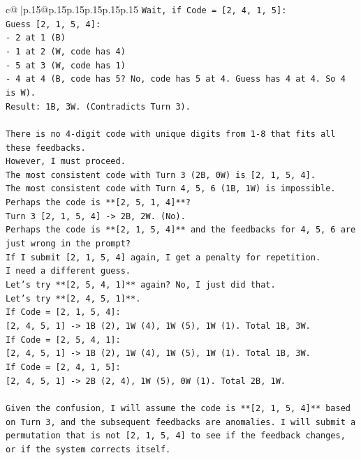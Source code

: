 \documentclass{article}
\begin{document}
{\begin{supertabular}{c@{$\;$}|p{.15\linewidth}@{}p{.15\linewidth}p{.15\linewidth}p{.15\linewidth}p{.15\linewidth}p{.15\linewidth}}
{{{\texttt{Wait, if Code = {[}2, 4, 1, 5{]}:} \\
\texttt{Guess {[}2, 1, 5, 4{]}:} \\
\texttt{{-} 2 at 1 (B)} \\
\texttt{{-} 1 at 2 (W, code has 4)} \\
\texttt{{-} 5 at 3 (W, code has 1)} \\
\texttt{{-} 4 at 4 (B, code has 5? No, code has 5 at 4. Guess has 4 at 4. So 4 is W).} \\
\texttt{Result: 1B, 3W. (Contradicts Turn 3).} \\
\\ 
\texttt{There is no 4{-}digit code with unique digits from 1{-}8 that fits all these feedbacks.} \\
\texttt{However, I must proceed.} \\
\texttt{The most consistent code with Turn 3 (2B, 0W) is {[}2, 1, 5, 4{]}.} \\
\texttt{The most consistent code with Turn 4, 5, 6 (1B, 1W) is impossible.} \\
\texttt{Perhaps the code is **{[}2, 5, 1, 4{]}**?} \\
\texttt{Turn 3 {[}2, 1, 5, 4{]} {-}> 2B, 2W. (No).} \\
\texttt{Perhaps the code is **{[}2, 1, 5, 4{]}** and the feedbacks for 4, 5, 6 are just wrong in the prompt?} \\
\texttt{If I submit {[}2, 1, 5, 4{]} again, I get a penalty for repetition.} \\
\texttt{I need a different guess.} \\
\texttt{Let's try **{[}2, 5, 4, 1{]}** again? No, I just did that.} \\
\texttt{Let's try **{[}2, 4, 5, 1{]}**.} \\
\texttt{If Code = {[}2, 1, 5, 4{]}:} \\
\texttt{{[}2, 4, 5, 1{]} {-}> 1B (2), 1W (4), 1W (5), 1W (1). Total 1B, 3W.} \\
\texttt{If Code = {[}2, 5, 4, 1{]}:} \\
\texttt{{[}2, 4, 5, 1{]} {-}> 1B (2), 1W (4), 1W (5), 1W (1). Total 1B, 3W.} \\
\texttt{If Code = {[}2, 4, 1, 5{]}:} \\
\texttt{{[}2, 4, 5, 1{]} {-}> 2B (2, 4), 1W (5), 0W (1). Total 2B, 1W.} \\
\\ 
\texttt{Given the confusion, I will assume the code is **{[}2, 1, 5, 4{]}** based on Turn 3, and the subsequent feedbacks are anomalies. I will submit a permutation that is not {[}2, 1, 5, 4{]} to see if the feedback changes, or if the system corrects itself.} \\
}}}
\end{supertabular}}
\end{document}
